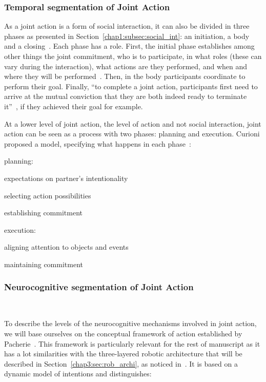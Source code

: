 \documentclass[a4paper,11pt,twoside]{StyleThese}
\begin{document}
\subsubsection{Temporal segmentation of Joint Action}
As a joint action is a form of social interaction, it can also be divided in three phases as presented in Section~\ref{chap1:subsec:social_int}: an initiation, a body and a closing~\cite{heesen_2017_social}. Each phase has a role. First, the initial phase establishes among other things the joint commitment, \ie who is to participate, in what roles (these can vary during the interaction), what actions are they performed, and when and where they will be performed~\cite{clark_2006_social}. Then, in the body participants coordinate to perform their goal. Finally, ``to complete a joint action, participants first need to arrive at the mutual conviction that they are both indeed ready to terminate it''~\cite{heesen_2017_social}, if they achieved their goal for example.

At a lower level of joint action, the level of action and not social interaction, joint action can be seen as a process with two phases: planning and execution. Curioni \etal{} proposed a model, specifying what happens in each phase~\cite{curioni_2017_joint}: 
\begin{bulletList}
	\item planning: 
	\begin{bulletList}
		\item expectations on partner's intentionality
		\item selecting action possibilities
		\item establishing commitment
	\end{bulletList}
	\item execution:
	\begin{bulletList}
		\item aligning attention to objects and events
		\item maintaining commitment
	\end{bulletList}
\end{bulletList}
\subsubsection{Neurocognitive segmentation of Joint Action}~\label{chap1:subsubsec:neuro_seg}

To describe the levels of the neurocognitive mechanisms involved in joint action, we will base ourselves on the conceptual framework of action established by Pacherie~\cite{pacherie_2008_phenomenology}. This framework is particularly relevant for the rest of manuscript as it has a lot similarities with the three-layered robotic architecture that will be described in Section~\ref{chap3:sec:rob_archi}, as noticed in~\cite{clodic_2017_key}. It is based on a dynamic model of intentions and distinguishes:
\end{document}
